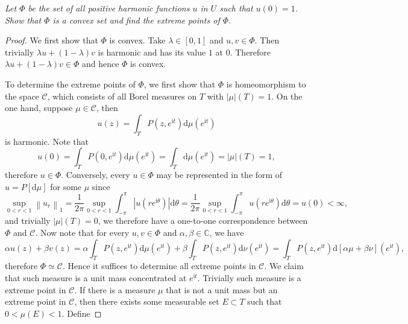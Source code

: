 \begin{problem}\em
Let $\Phi$ be the set of all positive harmonic functions $u$ in $U$ such that $u(0)=1$. Show that $\Phi$ is a convex set and find the extreme points of $\Phi$.
\end{problem}
\begin{proof}
We first show that $\Phi$ is convex. Take $\lambda\in[0,1]$ and $u,v\in\Phi$. Then trivially $\lambda u+(1-\lambda)v$ is harmonic and has its value $1$ at $0$. Therefore $\lambda u+(1-\lambda)v\in\Phi$ and hence $\Phi$ is convex.\par
To determine the extreme points of $\Phi$, we first show that $\Phi$ is homeomorphism to the space $\mathscr{C}$, which consists of all Borel measures on $T$ with $|\mu|(T)=1$. On the one hand, suppose $\mu\in\mathscr{C}$, then 
$$
u\left( z \right) =\int_T{P\left( z,e^{\mathrm{i}t} \right) \mathrm{d}\mu \left( e^{\mathrm{i}t} \right)}
$$
is harmonic. Note that 
$$
u\left( 0 \right) =\int_T{P\left( 0,e^{\mathrm{i}t} \right) \mathrm{d}\mu \left( e^{\mathrm{i}t} \right)}=\int_T{\mathrm{d}\mu \left( e^{\mathrm{i}t} \right)}=\left| \mu \right|\left( T \right) =1,
$$
therefore $u\in\Phi$. Conversely, every $u\in\Phi$ may be represented in the form of $u=P[\mathrm{d}\mu]$ for some $\mu$ since 
$$
\mathop {\mathrm{sup}} \limits_{0<r<1}\left\| u_r \right\| _1=\frac{1}{2\pi}\mathop {\mathrm{sup}} \limits_{0<r<1}\int_{-\pi}^{\pi}{\left| u\left( re^{\mathrm{i}\theta} \right) \right|\mathrm{d}\theta}=\frac{1}{2\pi}\mathop {\mathrm{sup}} \limits_{0<r<1}\int_{-\pi}^{\pi}{u\left( re^{\mathrm{i}\theta} \right) \mathrm{d}\theta}=u\left( 0 \right) <\infty ,
$$
and trivially $|\mu|(T)=0$, we therefore have a one-to-one correspondence between $\Phi$ and $\mathscr{C}$. Now note that for every $u,v\in\Phi$ and $\alpha,\beta\in\mathbb{C}$, we have 
$$
\alpha u\left( z \right) +\beta v\left( z \right) =\alpha \int_T{P\left( z,e^{\mathrm{i}t} \right) \mathrm{d}\mu \left( e^{\mathrm{i}t} \right)}+\beta \int_T{P\left( z,e^{\mathrm{i}t} \right) \mathrm{d}\nu \left( e^{\mathrm{i}t} \right)}=\int_T{P\left( z,e^{\mathrm{i}t} \right) \mathrm{d}\left[ \alpha \mu +\beta \nu \right] \left( e^{\mathrm{i}t} \right)},
$$
therefore $\Phi\simeq\mathscr{C}$. Hence it suffices to determine all extreme points in $\mathscr{C}$. We claim that such measure is a unit mass concentrated at $e^{\mathrm{i}t}$. Trivially such measure is a extreme point in $\mathscr{C}$. If there is a measure $\mu$ that is not a unit mass but an extreme point in $\mathscr{C}$, then there exists some measurable set $E\subset T$ such that $0<\mu(E)<1$. Define 

\end{proof}

